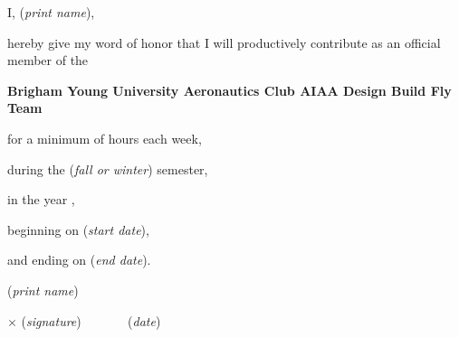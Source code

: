 \documentclass[contract]{byu-aero}
\begin{document}
\vspace*{0.5in}
\large
\noindent I, \underline{\hspace{7cm}} (\textit{print name}), 

\noindent hereby give my word of honor that I will productively contribute as an official member of the

\noindent \textbf{Brigham Young University Aeronautics Club AIAA Design Build Fly Team}

\noindent for a minimum of \underline{\hspace{1cm}} hours each week,

\noindent during the \underline{\hspace{2cm}} (\textit{fall or winter}) semester,

\noindent in the year \underline{\hspace{1.5cm}},

\noindent beginning on \underline{\hspace{5cm}} (\textit{start date}),

\noindent and ending on \underline{\hspace{5cm}} (\textit{end date}).

\vspace*{1.0in}

\noindent \underline{\hspace{6cm}} (\textit{print name})

\vspace*{0.5in}

\noindent \(\times\)\underline{\hspace{6cm}} (\textit{signature}) ~~~~~~\underline{\hspace{4cm}} (\textit{date})
\end{document}
